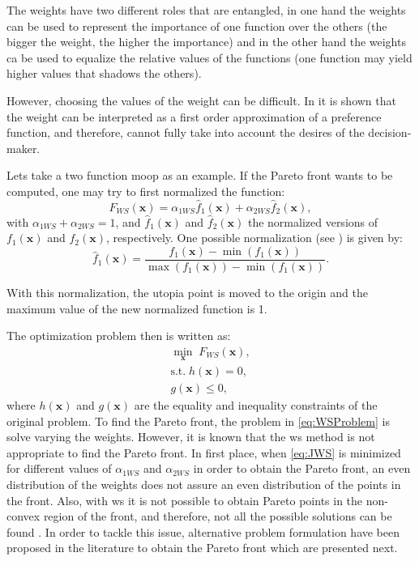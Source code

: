 The weights have two different roles that are entangled, in one hand the weights can be used to represent the importance of one function over the others (the bigger the weight, the higher the importance) and in the other hand the weights ca be used to equalize the relative values of the functions (one function may yield higher values that shadows the others).

However, choosing the values of the weight can be difficult. In \citet{Marler2010} it is shown that the weight can be interpreted as a first order approximation of a preference function, and therefore, cannot fully take into account the desires of the decision-maker.

Lets take a two function \gls{moop} as an example. If the Pareto front wants to be computed, one may try to first normalized the function:
\begin{equation}
F_{WS}(\mathbf{x}) = \alpha_{1WS} \hat{f}_{1}(\mathbf{x}) + \alpha_{2WS} \hat{f}_{2}(\mathbf{x}),
\label{eq:JWS}
\end{equation}
with $\alpha_{1WS} + \alpha_{2WS}=1$, and $\hat{f}_{1}(\mathbf{x})$ and $\hat{f}_{2}(\mathbf{x})$ the normalized versions of $f_{1}(\mathbf{x})$ and $f_{2}(\mathbf{x})$, respectively. One possible normalization (see \citet{Marler2004}) is given by:
\begin{equation}
\hat{f}_{1}(\mathbf{x}) = \frac{f_{1}(\mathbf{x})-\min{\left( f_{1}(\mathbf{x})\right) }}{\max{(f_{1}(\mathbf{x}))}-\min{\left( f_{1}(\mathbf{x})\right) }}.
\label{eq:NormalizedJ}
\end{equation}

With this normalization, the utopia point is moved to the origin and the maximum value of the new normalized function is 1.

The optimization problem then is written as:
\begin{equation}
\begin{gathered}
\min_{\mathbf{x}}{\; F_{WS}(\mathbf{x})}, \\
\text{s.t.} \; h(\mathbf{x})=0, \\
g(\mathbf{x}) \leq 0,
\end{gathered}
\label{eq:WSProblem}
\end{equation}
%
where $h(\mathbf{x})$ and $g(\mathbf{x})$ are the equality and inequality constraints of the original problem. To find the Pareto front, the problem in \eqref{eq:WSProblem} is solve varying the weights. However, it is known that the \gls{ws} method is not appropriate to find the Pareto front. In first place, when \eqref{eq:JWS} is minimized for different values of $\alpha_{1WS}$ and $\alpha_{2WS}$ in order to obtain the Pareto front, an even distribution of the weights does not assure an even distribution of the points in the front. Also, with \gls{ws} it is not possible to obtain Pareto points in the non-convex region of the front, and therefore, not all the possible solutions can be found \citep{Das1997}. In order to tackle this issue, alternative problem formulation have been proposed in the literature to obtain the Pareto front which are presented next.
